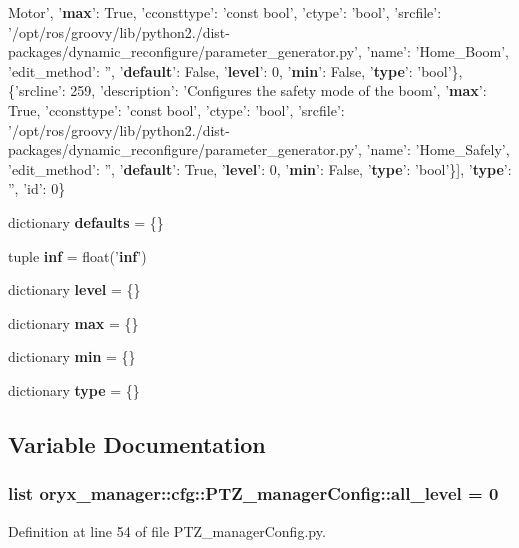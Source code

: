 \begin{DoxyCompactItemize}
\-Motor', '{\bf max}'\-: \-True, 'cconsttype'\-: 'const bool', 'ctype'\-: 'bool', 'srcfile'\-: '/opt/ros/groovy/lib/python2./dist-\/packages/dynamic\-\_\-reconfigure/parameter\-\_\-generator.\-py', 'name'\-: '\-Home\-\_\-\-Boom', 'edit\-\_\-method'\-: '', '{\bf default}'\-: \-False, '{\bf level}'\-: 0, '{\bf min}'\-: \-False, '{\bf type}'\-: 'bool'\}, \{'srcline'\-: 259, 'description'\-: '\-Configures the safety mode of the boom', '{\bf max}'\-: \-True, 'cconsttype'\-: 'const bool', 'ctype'\-: 'bool', 'srcfile'\-: '/opt/ros/groovy/lib/python2./dist-\/packages/dynamic\-\_\-reconfigure/parameter\-\_\-generator.\-py', 'name'\-: '\-Home\-\_\-\-Safely', 'edit\-\_\-method'\-: '', '{\bf default}'\-: \-True, '{\bf level}'\-: 0, '{\bf min}'\-: \-False, '{\bf type}'\-: 'bool'\}], '{\bf type}'\-: '', 'id'\-: 0\}
\item 
dictionary {\bf defaults} = \{\}
\item 
tuple {\bf inf} = float('{\bf inf}')
\item 
dictionary {\bf level} = \{\}
\item 
dictionary {\bf max} = \{\}
\item 
dictionary {\bf min} = \{\}
\item 
dictionary {\bf type} = \{\}
\end{DoxyCompactItemize}


\subsection{\-Variable \-Documentation}
\subsubsection[{all\-\_\-level}]{\setlength{\rightskip}{0pt plus 5cm}list {\bf oryx\-\_\-manager\-::cfg\-::\-P\-T\-Z\-\_\-manager\-Config\-::all\-\_\-level} = 0}\label{namespaceoryx__manager_1_1cfg_1_1PTZ__managerConfig_a609dbf7fcb087483ca6ffab198c299bb}


\-Definition at line 54 of file \-P\-T\-Z\-\_\-manager\-Config.\-py.

